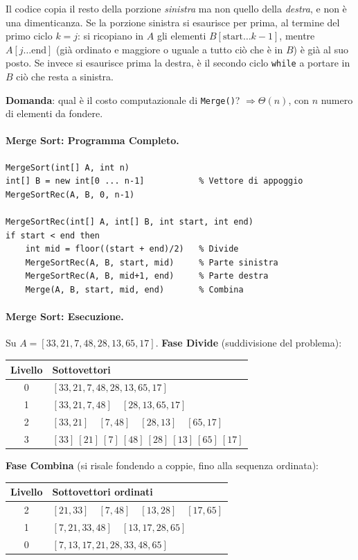 \documentclass[12pt, a4paper]{article}
\begin{document}
\begin{tcolorbox}[colback=lightergray!5, colframe=tocsubsec, title=\textbf{Nota mia (non nelle slide): perché un solo ciclo di copia?}]
Il codice copia il resto della porzione \emph{sinistra} ma non quello della \emph{destra}, e non è una dimenticanza. Se la porzione sinistra si esaurisce per prima, al termine del primo ciclo $k=j$: si ricopiano in $A$ gli elementi $B[\text{start}\ldots k-1]$, mentre $A[j\ldots\text{end}]$ (già ordinato e maggiore o uguale a tutto ciò che è in $B$) è già al suo posto. Se invece si esaurisce prima la destra, è il secondo ciclo \texttt{while} a portare in $B$ ciò che resta a sinistra.
\end{tcolorbox}

\textbf{Domanda}: qual è il costo computazionale di \texttt{Merge()}? $\Rightarrow \Theta(n)$, con $n$ numero di elementi da fondere.

\paragraph{Merge Sort: Programma Completo.}
\begin{verbatim}
MergeSort(int[] A, int n)
int[] B = new int[0 ... n-1]           % Vettore di appoggio
MergeSortRec(A, B, 0, n-1)

MergeSortRec(int[] A, int[] B, int start, int end)
if start < end then
    int mid = floor((start + end)/2)   % Divide
    MergeSortRec(A, B, start, mid)     % Parte sinistra
    MergeSortRec(A, B, mid+1, end)     % Parte destra
    Merge(A, B, start, mid, end)       % Combina
\end{verbatim}

\paragraph{Merge Sort: Esecuzione.}
Su $A=[33,21,7,48,28,13,65,17]$. \textbf{Fase Divide} (suddivisione del problema):
\begin{center}
\begin{tabular}{cl}
\toprule
\textbf{Livello} & \textbf{Sottovettori} \\
\midrule
0 & $[33,21,7,48,28,13,65,17]$ \\
1 & $[33,21,7,48]\quad[28,13,65,17]$ \\
2 & $[33,21]\quad[7,48]\quad[28,13]\quad[65,17]$ \\
3 & $[33]\ [21]\ [7]\ [48]\ [28]\ [13]\ [65]\ [17]$ \\
\bottomrule
\end{tabular}
\end{center}
\textbf{Fase Combina} (si risale fondendo a coppie, fino alla sequenza ordinata):
\begin{center}
\begin{tabular}{cl}
\toprule
\textbf{Livello} & \textbf{Sottovettori ordinati} \\
\midrule
2 & $[21,33]\quad[7,48]\quad[13,28]\quad[17,65]$ \\
1 & $[7,21,33,48]\quad[13,17,28,65]$ \\
0 & $[7,13,17,21,28,33,48,65]$ \\
\bottomrule
\end{tabular}
\end{center}
\end{document}
